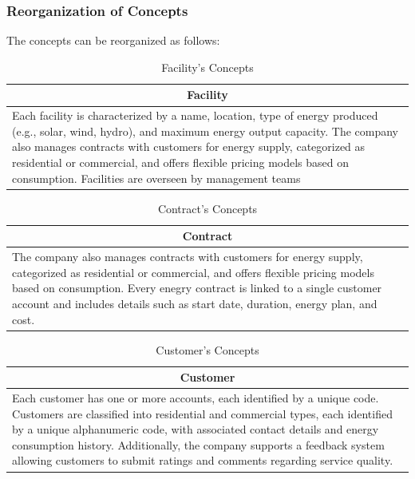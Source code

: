 \subsubsection{Reorganization of Concepts}
The concepts can be reorganized as follows:
\begin{table}[H]
    \renewcommand{\arraystretch}{1.3} %
    \begin{tabularx}{\textwidth}{|X|}
    \hline  \multicolumn{1}{|c|}{\textbf{Facility}}    \\ \hline
    Each facility is characterized by a name, location, type of energy produced (e.g., solar, wind, hydro), and maximum energy output capacity. The company also manages contracts with customers for energy supply, categorized as residential or commercial, and offers flexible pricing models based on consumption. Facilities are overseen by management teams \\ \hline
    \end{tabularx}
    \caption{Facility's Concepts}
    \end{table}

\begin{table}[H]
    \renewcommand{\arraystretch}{1.3} %
    \begin{tabularx}{\textwidth}{|X|}
    \hline  \multicolumn{1}{|c|}{\textbf{Contract}}    \\ \hline
    The company also manages contracts with customers for energy supply, categorized as residential or commercial, and offers flexible pricing models based on consumption.
    Every enegry contract is linked to a single customer account and includes details such as start date, duration, energy plan, and cost. \\ \hline
    \end{tabularx}
    \caption{Contract's Concepts}
    \end{table}

\begin{table}[H]
    \renewcommand{\arraystretch}{1.3} %
    \begin{tabularx}{\textwidth}{|X|}
    \hline  \multicolumn{1}{|c|}{\textbf{Customer}}   \\ \hline
    Each customer has one or more accounts, each identified by a unique code. Customers are classified into residential and commercial types, each identified by a unique alphanumeric code, with associated contact details and energy consumption history. Additionally, the company supports a feedback system allowing customers to submit ratings and comments regarding service quality. \\ \hline
    \end{tabularx}
    \caption{Customer's Concepts}
    \end{table}

